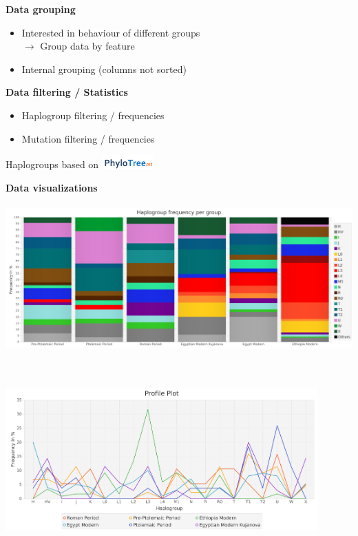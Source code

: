 \documentclass[a0paper,portrait]{baposter}
\begin{document}
\begin{poster}
{	\begin{minipage}[t]{0.5\textwidth}
		\textbf{Data grouping}
		\begin{itemize}[leftmargin=*]
			\item Interested in behaviour of different groups\\
			$\rightarrow$ Group data by feature
			\item Internal grouping (columns not sorted)
		\end{itemize}
	\end{minipage}
	\hspace{0.5em}
	\begin{minipage}[t]{0.5\textwidth}
		\textbf{Data filtering / Statistics}
		\begin{itemize}[leftmargin=*]
			\item Haplogroup filtering / frequencies
			\item Mutation filtering / frequencies
		\end{itemize}
		Haplogroups based on \includegraphics[width=2cm]{figures/phylotree.png}
	\end{minipage}

	\vspace{2em}

	\begin{minipage}[t]{0.5\textwidth}
		\textbf{Data visualizations}\\
		\\
		\includegraphics[width=\textwidth, left]{figures/stackedBarchart.png}
	\end{minipage}
	\hspace{0.5em}
	\begin{minipage}[t]{0.5\textwidth}
		\textbf{}\\
		\\
		\includegraphics[width=0.9\textwidth, left]{figures/profile.png}
	\end{minipage}

}
\end{poster}
\end{document}

